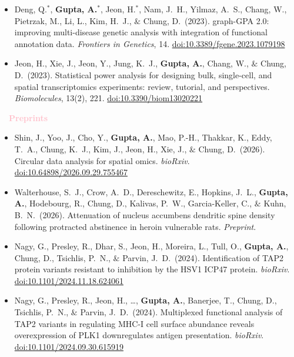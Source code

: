 \documentclass[11pt,a4paper,roman]{moderncv}        %
\begin{document}
\begin{itemize}
\item Deng, Q.$^*$, \textbf{Gupta, A.$^*$}, Jeon, H.$^*$, Nam, J.\ H., Yilmaz, A.\ S., Chang, W., Pietrzak, M., Li, L., Kim, H.\ J., $\&$ Chung, D.\ (2023). graph-GPA 2.0: improving multi-disease genetic analysis with integration of functional annotation data. \textit{Frontiers in Genetics}, 14. \href{https://doi.org/10.3389/fgene.2023.1079198}{doi:10.3389/fgene.2023.1079198}\par\vspace{5pt}
\item Jeon, H., Xie, J., Jeon, Y., Jung, K.\ J., \textbf{Gupta, A.}, Chang, W., $\&$ Chung, D.\ (2023). Statistical power analysis for designing bulk, single-cell, and spatial transcriptomics experiments: review, tutorial, and perspectives. \textit{Biomolecules}, 13(2), 221. \href{https://doi.org/10.3390/biom13020221}{doi:10.3390/biom13020221}
\end{itemize}
\vskip 0.3cm
\textbf{\textcolor{pink}{\large{$\quad$Preprints}}}
\vskip 0.2cm
\begin{itemize}
\item Shin, J., Yoo, J., Cho, Y., \textbf{Gupta, A.}, Mao, P.-H., Thakkar, K., Eddy, T.\ A., Chung, K.\ J., Kim, J., Jeon, H., Xie, J., $\&$ Chung, D.\ (2026). Circular data analysis for spatial omics. \textit{bioRxiv}. \href{https://doi.org/10.64898/2026.09.29.755467}{doi:10.64898/2026.09.29.755467}\par\vspace{5pt}
\item Walterhouse, S.\ J., Crow, A.\ D., Dereschewitz, E., Hopkins, J.\ L., \textbf{Gupta, A.}, Hodebourg, R., Chung, D., Kalivas, P.\ W., Garcia-Keller, C., $\&$ Kuhn, B.\ N.\ (2026). Attenuation of nucleus accumbens dendritic spine density following protracted abstinence in heroin vulnerable rats. \textit{Preprint}.\par\vspace{5pt}
\item Nagy, G., Presley, R., Dhar, S., Jeon, H., Moreira, L., Tull, O., \textbf{Gupta, A.}, Chung, D., Tsichlis, P.\ N., $\&$ Parvin, J.\ D.\ (2024). Identification of TAP2 protein variants resistant to inhibition by the HSV1 ICP47 protein. \textit{bioRxiv}. \href{https://doi.org/10.1101/2024.11.18.624061}{doi:10.1101/2024.11.18.624061}\par\vspace{5pt}
\item Nagy, G., Presley, R., Jeon, H., \ldots, \textbf{Gupta, A.}, Banerjee, T., Chung, D., Tsichlis, P.\ N., $\&$ Parvin, J.\ D.\ (2024). Multiplexed functional analysis of TAP2 variants in regulating MHC-I cell surface abundance reveals overexpression of PLK1 downregulates antigen presentation. \textit{bioRxiv}. \href{https://doi.org/10.1101/2024.09.30.615919}{doi:10.1101/2024.09.30.615919}
\end{itemize}
\end{document}
